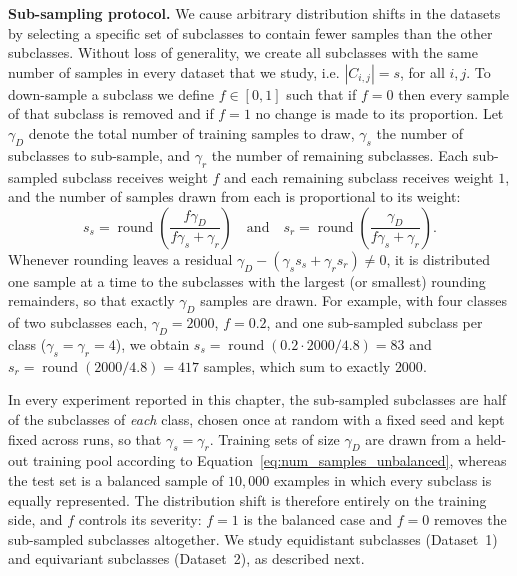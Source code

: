 ﻿\documentclass[../ppgc-tese.tex]{subfiles}
\begin{document}
\noindent\textbf{Sub-sampling protocol.}
We cause arbitrary distribution shifts in the datasets by selecting a specific set of subclasses to contain fewer samples than the other subclasses. Without loss of generality, we create all subclasses with the same number of samples in every dataset that we study, i.e. $|C_{i,j}| = s$, for all $i,j$. To down-sample a subclass we define $f \in [0, 1]$ such that if $f = 0$ then every sample of that subclass is removed and if $f = 1$ no change is made to its proportion. Let $\gamma_D$ denote the total number of training samples to draw, $\gamma_s$ the number of subclasses to sub-sample, and $\gamma_r$ the number of remaining subclasses. Each sub-sampled subclass receives weight $f$ and each remaining subclass receives weight $1$, and the number of samples drawn from each is proportional to its weight:
\begin{equation}\label{eq:num_samples_unbalanced}
    s_{s} = \operatorname{round}\!\left(\frac{f\gamma_D}{f\gamma_s + \gamma_r}\right)
    \quad \text{and} \quad
    s_{r} = \operatorname{round}\!\left(\frac{\gamma_D}{f\gamma_s + \gamma_r}\right).
\end{equation}
Whenever rounding leaves a residual $\gamma_D - (\gamma_s s_s + \gamma_r s_r) \neq 0$, it is distributed one sample at a time to the subclasses with the largest (or smallest) rounding remainders, so that exactly $\gamma_D$ samples are drawn. For example, with four classes of two subclasses each, $\gamma_D = 2000$, $f = 0.2$, and one sub-sampled subclass per class ($\gamma_s = \gamma_r = 4$), we obtain $s_{s} = \operatorname{round}(0.2 \cdot 2000 / 4.8) = 83$ and $s_{r} = \operatorname{round}(2000 / 4.8) = 417$ samples, which sum to exactly $2000$.

In every experiment reported in this chapter, the sub-sampled subclasses are half of the subclasses of \emph{each} class, chosen once at random with a fixed seed and kept fixed across runs, so that $\gamma_s = \gamma_r$. Training sets of size $\gamma_D$ are drawn from a held-out training pool according to Equation~\ref{eq:num_samples_unbalanced}, whereas the test set is a balanced sample of $10{,}000$ examples in which every subclass is equally represented. The distribution shift is therefore entirely on the training side, and $f$ controls its severity: $f = 1$ is the balanced case and $f = 0$ removes the sub-sampled subclasses altogether. We study equidistant subclasses (Dataset~1) and equivariant subclasses (Dataset~2), as described next.
\end{document}
